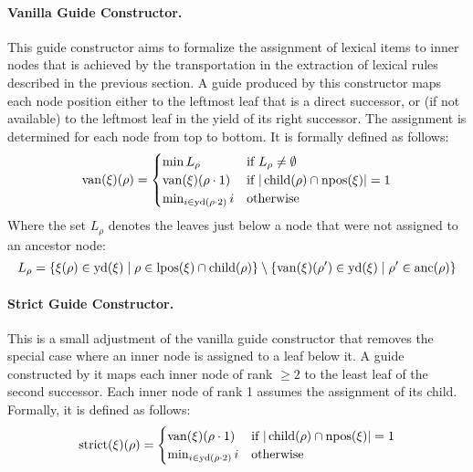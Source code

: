 \documentclass[../document.tex]{subfiles}
\begin{document}
    \paragraph{Vanilla Guide Constructor.}
    This guide constructor aims to formalize the assignment of lexical items to inner nodes that is achieved by the transportation in the extraction of lexical  rules described in the previous section.
    A guide produced by this constructor maps each node position either to the leftmost leaf that is a direct successor, or (if not available) to the leftmost leaf in the yield of its right successor.
    The assignment is determined for each node from top to bottom.
    It is formally defined as follows:
    \[
        \mathrm{van}(\xi)(\rho) = \begin{cases}
            \min L_\rho & \text{if $L_\rho \neq \emptyset$} \\
            \mathrm{van}(\xi)(\rho \cdot 1) & \text{if $|\operatorname{child}(\rho) \cap \operatorname{npos}(\xi)| = 1$} \\
            \min_{i \in \operatorname{yd}(\rho\cdot 2)} i &\text{otherwise}
        \end{cases}
    \]
    Where the set \(L_\rho\) denotes the leaves just below a node that were not assigned to an ancestor node:
    \[
        L_\rho = \{\xi(\rho) \in \operatorname{yd}(\xi) \mid \rho \in \operatorname{lpos}(\xi) \cap \operatorname{child}(\rho) \} \setminus \{\mathrm{van}(\xi)(\rho') \in \operatorname{yd}(\xi) \mid \rho' \in \operatorname{anc}(\rho)\}
    \]

    \paragraph{Strict Guide Constructor.}
    This is a small adjustment of the vanilla guide constructor that removes the special case where an inner node is assigned to a leaf below it.
    A guide constructed by it maps each inner node of rank \(\ge 2\) to the least leaf of the second successor.
    Each inner node of rank 1 assumes the assignment of its child.
    Formally, it is defined as follows:
    \[
        \mathrm{strict}(\xi)(\rho) = \begin{cases}
            \mathrm{van}(\xi)(\rho \cdot 1) & \text{if $|\operatorname{child}(\rho) \cap \operatorname{npos}(\xi)| = 1$} \\
            \min_{i \in \operatorname{yd}(\rho\cdot 2)} i &\text{otherwise}
        \end{cases}
    \]
\end{document}
